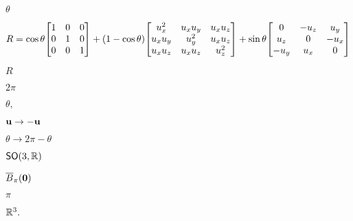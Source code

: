 \documentclass[10pt]{book}
\begin{document}
\begin{mdSnippets}
\begin{mdInlineSnippet}[2554a2bb846cffd697389e5dc8912759]%
$\theta$\end{mdInlineSnippet}%
\begin{mdDisplaySnippet}[1d98412f68004ee8cdcba07da5a6f453]%
\[%
R = \cos\theta \mqty[
1 & 0 & 0 \\
0 & 1 & 0 \\
0 & 0 & 1
]
+ (1 - \cos\theta) \mqty[
u_x^2 & u_x u_y & u_x u_z \\
u_x u_y & u_y^2 & u_x u_z \\
u_x u_z & u_x u_z & u_z^2
]
+ \sin\theta \mqty[
0 & -u_z & u_y \\
u_z & 0 & -u_x \\
-u_y & u_x & 0
]
\]%
\end{mdDisplaySnippet}%
\begin{mdInlineSnippet}[e1e1d3d40573127e9ee0480caf1283d6]%
$R$\end{mdInlineSnippet}%
\begin{mdInlineSnippet}%
$2\pi$\end{mdInlineSnippet}%
\begin{mdInlineSnippet}[5c0e9f2c073d0f5538b3b3540277658b]%
$\theta,$\end{mdInlineSnippet}%
\begin{mdInlineSnippet}[9c0d7a708c1dd13c915ce51b4706890b]%
$\mathbf{u} \to -\mathbf{u}$\end{mdInlineSnippet}%
\begin{mdInlineSnippet}[b1189334ab269cab087e4e391585cd90]%
$\theta \to 2\pi - \theta$\end{mdInlineSnippet}%
\begin{mdInlineSnippet}%
$\mathsf{SO}(3,\mathbb{R})$\end{mdInlineSnippet}%
\begin{mdInlineSnippet}[40a9744fd7bcdbf40c4150ab8fd5e3eb]%
$\overline{B}_\pi(\mathbf{0})$\end{mdInlineSnippet}%
\begin{mdInlineSnippet}%
$\pi$\end{mdInlineSnippet}%
\begin{mdInlineSnippet}[19079f9300ede2ad4931825d38362a9c]%
$\mathbb{R}^3.$\end{mdInlineSnippet}%

\end{mdSnippets}
\end{document}
